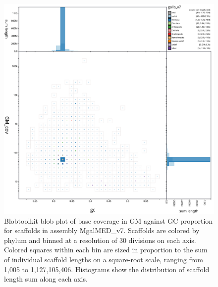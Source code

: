 \documentclass[11pt, a4paper]{article}
\begin{document}
\begin{figure}
	\includegraphics[width=\linewidth]{figures/btk_blob_MgalMED_v7}
	\caption{Blobtoolkit blob plot of base coverage in GM against GC proportion for scaffolds in assembly MgalMED\_v7. Scaffolds are colored by phylum and binned at a resolution of 30 divisions on each axis. Colored squares within each bin are sized in proportion to the sum of individual scaffold lengths on a square-root scale, ranging from 1,005 to 1,127,105,406. Histograms show the distribution of scaffold length sum along each axis.}
	\label{supfig:btk-blob-MgalMED}
\end{figure}
\end{document}
